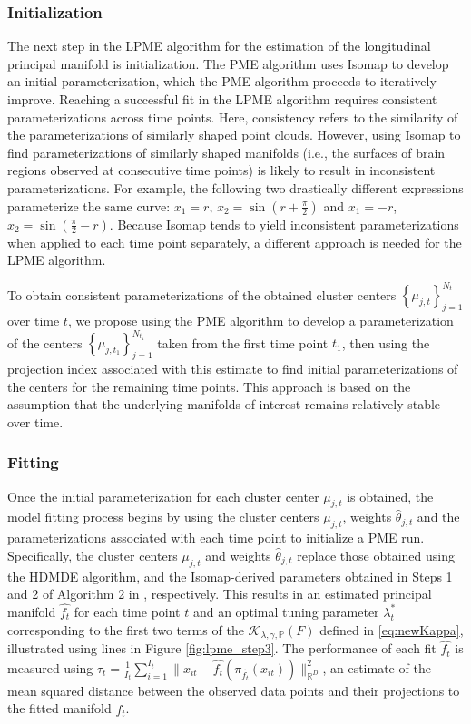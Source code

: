 \documentclass[12pt]{article}
\theoremstyle{definition}
\begin{document}
\subsubsection{Initialization}

The next step in the LPME algorithm for the estimation of the longitudinal principal manifold is initialization. The PME algorithm uses Isomap \citep{tenenbaum2000Global} to develop an initial parameterization, which the PME algorithm proceeds to iteratively improve. Reaching a successful fit in the LPME algorithm requires consistent parameterizations across time points. Here, consistency refers to the similarity of the parameterizations of similarly shaped point clouds. However, using Isomap to find parameterizations of similarly shaped manifolds (i.e., the surfaces of brain regions observed at consecutive time points) is likely to result in inconsistent parameterizations. For example, the following two drastically different expressions parameterize the same curve: $x_1 = r$, $x_2 = \sin(r + \frac{\pi}{2})$ and $x_1 = -r$, $x_2 = \sin(\frac{\pi}{2} - r)$. Because Isomap tends to yield inconsistent parameterizations when applied to each time point separately, a different approach is needed for the LPME algorithm.

To obtain consistent parameterizations of the obtained cluster centers $\left\{\mu_{j, t}\right\}_{j=1}^{N_t}$ over time $t$, we propose using the PME algorithm to develop a parameterization of the centers $\left\{\mu_{j, t_1}\right\}_{j=1}^{N_{t_1}}$ taken from the first time point $t_1$, then using the projection index associated with this estimate to find initial parameterizations of the centers for the remaining time points. This approach is based on the assumption that the underlying manifolds of interest remains relatively stable over time.

\subsubsection{Fitting}

Once the initial parameterization for each cluster center $\mu_{j, t}$ is obtained, the model fitting process begins by using the cluster centers $\mu_{j, t}$, weights $\hat{\theta}_{j, t}$ and the parameterizations associated with each time point to initialize a PME run. Specifically, the cluster centers $\mu_{j, t}$ and weights $\hat{\theta}_{j, t}$ replace those obtained using the HDMDE algorithm, and the Isomap-derived parameters obtained in Steps 1 and 2 of Algorithm 2 in \cite{meng2021Principal}, respectively.
This results in an estimated principal manifold $\widehat{f_t}$ for each time point $t$ and an optimal tuning parameter $\lambda_t^*$ corresponding to the first two terms of the $\mathcal{K}_{\lambda, \gamma, \mathbb{P}}(F)$ defined in \eqref{eq:newKappa}, illustrated using lines in Figure \ref{fig:lpme_step3}. The performance of each fit $\widehat{f_t}$ is measured using $\tau_t = \frac{1}{I_t}\sum_{i=1}^{I_t}\| x_{it} - \widehat{f_t}(\pi_{\widehat{f_t}}(x_{it}))\|^{2}_{\mathbb{R}^D}$, an estimate of the mean squared distance between the observed data points and their projections to the fitted manifold $\widehat{f_t}$.
\end{document}
